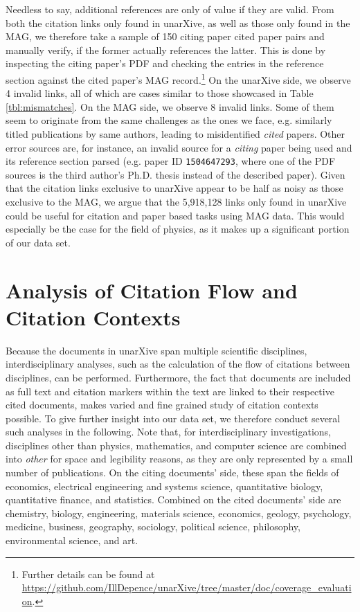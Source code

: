 Needless to say, additional references are only of value if they are valid. From both the citation links only found in unarXive, as well as those only found in the MAG, we therefore take a sample of 150 citing paper cited paper pairs and manually verify, if the former actually references the latter. This is done by inspecting the citing paper's PDF and checking the entries in the reference section against the cited paper's MAG record.\footnote{Further details can be found at \url{https://github.com/IllDepence/unarXive/tree/master/doc/coverage_evaluation}.} On the unarXive side, we observe 4 invalid links, all of which are cases similar to those showcased in Table \ref{tbl:mismatches}. On the MAG side, we observe 8 invalid links. Some of them seem to originate from the same challenges as the ones we face, e.g. similarly titled publications by same authors, leading to misidentified \emph{cited} papers. Other error sources are, for instance, an invalid source for a \emph{citing} paper being used and its reference section parsed (e.g. paper ID \texttt{1504647293}, where one of the PDF sources is the third author's Ph.D. thesis instead of the described paper). Given that the citation links exclusive to unarXive appear to be half as noisy as those exclusive to the  MAG, we argue that the 5,918,128 links only found in unarXive could be useful for citation and paper based tasks using MAG data. This would especially be the case for the field of physics, as it makes up a significant portion of our data set.

\section{Analysis of Citation Flow and Citation Contexts}
\label{sec:analysis}

Because the documents in unarXive span multiple scientific disciplines, interdisciplinary analyses, such as the calculation of the flow of citations between disciplines, can be performed. Furthermore, the fact that documents are included as full text and citation markers within the text are linked to their respective cited documents, makes varied and fine grained study of citation contexts possible. To give further insight into our data set, we therefore conduct several such analyses in the following. Note that, for interdisciplinary investigations, disciplines other than physics, mathematics, and computer science are combined into \emph{other} for space and legibility reasons, as they are only represented by a small number of publications. On the citing documents' side, these span the fields of economics, electrical engineering and systems science, quantitative biology, quantitative finance, and statistics. Combined on the cited documents' side are chemistry, biology, engineering, materials science, economics, geology, psychology, medicine, business, geography, sociology, political science, philosophy, environmental science, and art.

